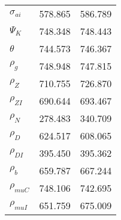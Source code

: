 \begin{center}
\begin{longtable}{lcc}
$ {\sigma_{ai}}        $	 & 	     578.865	 & 	     586.789 \\ 
$ {\Psi_{K}}           $	 & 	     748.348	 & 	     748.443 \\ 
$ {\theta}             $	 & 	     744.573	 & 	     746.367 \\ 
$ {\rho_g}             $	 & 	     748.948	 & 	     747.815 \\ 
$ {\rho_Z}             $	 & 	     710.755	 & 	     726.870 \\ 
$ {\rho_{ZI}}          $	 & 	     690.644	 & 	     693.467 \\ 
$ {\rho_N}             $	 & 	     278.483	 & 	     340.709 \\ 
$ {\rho_D}             $	 & 	     624.517	 & 	     608.065 \\ 
$ {\rho_{DI}}          $	 & 	     395.450	 & 	     395.362 \\ 
$ {\rho_b}             $	 & 	     659.787	 & 	     667.244 \\ 
$ {\rho_{muC}}         $	 & 	     748.106	 & 	     742.695 \\ 
$ {\rho_{muI}}         $	 & 	     651.759	 & 	     675.009 \\ 
\end{longtable}
 \end{center}
